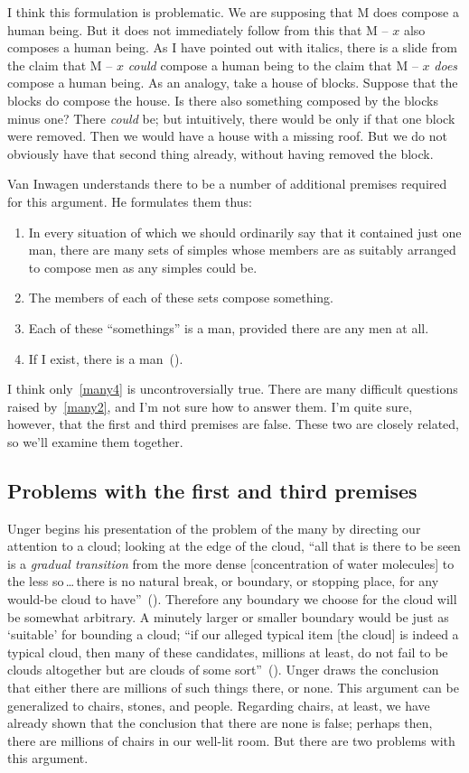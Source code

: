 \documentclass[11pt]{article}
\begin{document}
\begin{spacing}{1.5}
I think this formulation is problematic. We are supposing that M does compose a human being. But it does not immediately follow from this that M -- $x$ also composes a human being. As I have pointed out with italics, there is a slide from the claim that M -- $x$ {\em could} compose a human being to the claim that M -- $x$ {\em does} compose a human being. As an analogy, take a house of blocks. Suppose that the blocks do compose the house. Is there also something composed by the blocks minus one? There {\em could} be; but intuitively, there would be only if that one block were removed. Then we would have a house with a missing roof. But we do not obviously have that second thing already, without having removed the block.

Van Inwagen understands there to be a number of additional premises required for this argument. He formulates them thus:
\begin{enumerate}
	\item In every situation of which we should ordinarily say that it contained just one man, there are many sets of simples whose members are as suitably arranged to compose men as any simples could be. \label{many1}
	\item The members of each of these sets compose something. \label{many2}
	\item Each of these ``somethings'' is a man, provided there are any men at all. \label{many3}
	\item If I exist, there is a man~(\citeyear[216]{inwagen1995}). \label{many4}
\end{enumerate}
I think only~\ref{many4} is uncontroversially true. There are many difficult questions raised by~\ref{many2}, and I'm not sure how to answer them. I'm quite sure, however, that the first and third premises are false. These two are closely related, so we'll examine them together.

\subsection{Problems with the first and third premises}
\label{many13p}
Unger begins his presentation of the problem of the many by directing our attention to a cloud; looking at the edge of the cloud, ``all that is there to be seen is a {\em gradual transition} from the more dense [concentration of water molecules] to the less so\,\ldots\,there is no natural break, or boundary, or stopping place, for any would-be cloud to have''~(\citeyear[415]{unger1980a}). Therefore any boundary we choose for the cloud will be somewhat arbitrary. A minutely larger or smaller boundary would be just as `suitable' for bounding a cloud; ``if our alleged typical item [the cloud] is indeed a typical cloud, then many of these candidates, millions at least, do not fail to be clouds altogether but are clouds of some sort''~(\citeyear[421]{unger1980a}). Unger draws the conclusion that either there are millions of such things there, or none. This argument can be generalized to chairs, stones, and people. Regarding chairs, at least, we have already shown that the conclusion that there are none is false; perhaps then, there are millions of chairs in our well-lit room. But there are two problems with this argument.


\end{spacing}
\end{document}
